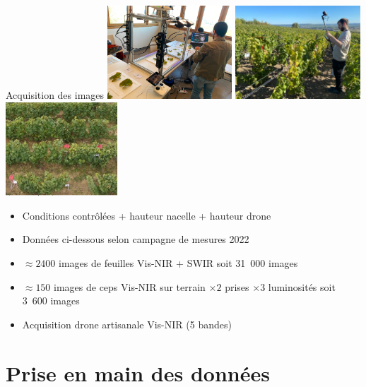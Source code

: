 \documentclass[presentation, aspectratio=169]{beamer}
\begin{document}
\begin{frame}{Acquisition des images}
  \includegraphics[height=35mm]{dispositif}
  \hfill
  \includegraphics[height=35mm]{champs}  
  \hfill
  \includegraphics[height=35mm]{drone}
  \begin{itemize}
  \item Conditions contrôlées + hauteur nacelle + hauteur drone
  \item Données ci-dessous selon campagne de mesures 2022
  \item $\approx2400$ images de feuilles Vis-NIR + SWIR soit 31\ 000
    images
  \item $\approx150$ images de ceps Vis-NIR sur terrain $\times2$
    prises $\times3$ luminosités soit 3\ 600 images
  \item Acquisition drone artisanale Vis-NIR (5 bandes)
  \end{itemize}
\end{frame}


\section{Prise en main des données}
\end{document}
